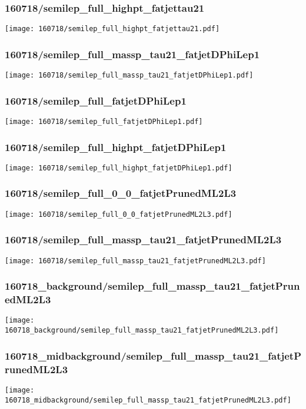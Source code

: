 \begin{frame}
   \frametitle{\small 160718/semilep\_full\_highpt\_fatjettau21}
   \centering
   \texttt{[image: 160718/semilep\_full\_highpt\_fatjettau21.pdf]}
\end{frame}

\begin{frame}
   \frametitle{\small 160718/semilep\_full\_massp\_tau21\_fatjetDPhiLep1}
   \centering
   \texttt{[image: 160718/semilep\_full\_massp\_tau21\_fatjetDPhiLep1.pdf]}
\end{frame}

\begin{frame}
   \frametitle{\small 160718/semilep\_full\_fatjetDPhiLep1}
   \centering
   \texttt{[image: 160718/semilep\_full\_fatjetDPhiLep1.pdf]}
\end{frame}

\begin{frame}
   \frametitle{\small 160718/semilep\_full\_highpt\_fatjetDPhiLep1}
   \centering
   \texttt{[image: 160718/semilep\_full\_highpt\_fatjetDPhiLep1.pdf]}
\end{frame}

\begin{frame}
   \frametitle{\small 160718/semilep\_full\_0\_0\_fatjetPrunedML2L3}
   \centering
   \texttt{[image: 160718/semilep\_full\_0\_0\_fatjetPrunedML2L3.pdf]}
\end{frame}

\begin{frame}
   \frametitle{\small 160718/semilep\_full\_massp\_tau21\_fatjetPrunedML2L3}
   \centering
   \texttt{[image: 160718/semilep\_full\_massp\_tau21\_fatjetPrunedML2L3.pdf]}
\end{frame}

\begin{frame}
   \frametitle{\small 160718\_background/semilep\_full\_massp\_tau21\_fatjetPrunedML2L3}
   \centering
   \texttt{[image: 160718\_background/semilep\_full\_massp\_tau21\_fatjetPrunedML2L3.pdf]}
\end{frame}

\begin{frame}
   \frametitle{\small 160718\_midbackground/semilep\_full\_massp\_tau21\_fatjetPrunedML2L3}
   \centering
   \texttt{[image: 160718\_midbackground/semilep\_full\_massp\_tau21\_fatjetPrunedML2L3.pdf]}
\end{frame}

